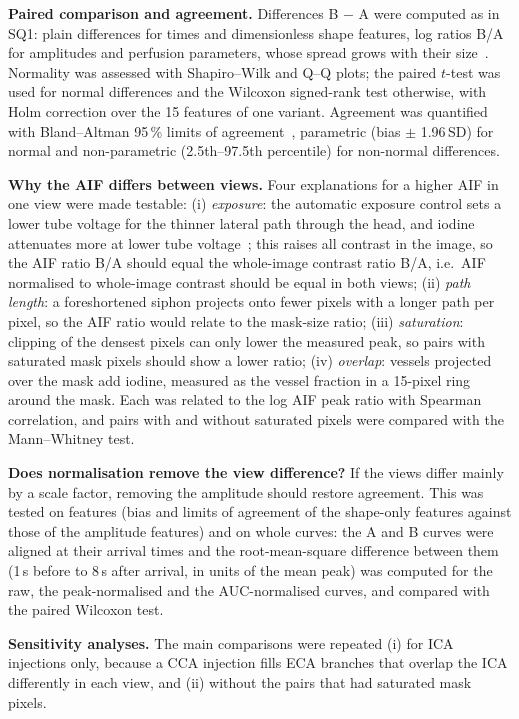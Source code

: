 \textbf{Paired comparison and agreement.} Differences B $-$ A were computed as in SQ1: plain differences for
times and dimensionless shape features, log ratios B/A for amplitudes and perfusion parameters, whose spread
grows with their size~\cite{bland1999}. Normality was assessed with Shapiro--Wilk and Q--Q plots; the paired
$t$-test was used for normal differences and the Wilcoxon signed-rank test otherwise, with Holm correction over
the 15 features of one variant. Agreement was quantified with Bland--Altman 95\,\% limits of
agreement~\cite{bland1999}, parametric (bias $\pm$ 1.96\,SD) for normal and non-parametric (2.5th--97.5th
percentile) for non-normal differences.

\textbf{Why the AIF differs between views.} Four explanations for a higher AIF in one view were made testable:
(i) \emph{exposure}: the automatic exposure control sets a lower tube voltage for the thinner lateral path through
the head, and iodine attenuates more at lower tube voltage~\cite{cho2012}; this raises all contrast in the image,
so the AIF ratio B/A should equal the whole-image contrast ratio B/A, i.e.\ AIF normalised to whole-image contrast
should be equal in both views; (ii) \emph{path length}: a foreshortened siphon projects onto fewer pixels with a
longer path per pixel, so the AIF ratio would relate to the mask-size ratio; (iii) \emph{saturation}: clipping of
the densest pixels can only lower the measured peak, so pairs with saturated mask pixels should show a lower
ratio; (iv) \emph{overlap}: vessels projected over the mask add iodine, measured as the vessel fraction in a
15-pixel ring around the mask. Each was related to the log AIF peak ratio with Spearman correlation, and pairs
with and without saturated pixels were compared with the Mann--Whitney test.

\textbf{Does normalisation remove the view difference?} If the views differ mainly by a scale factor, removing
the amplitude should restore agreement. This was tested on features (bias and limits of agreement of the
shape-only features against those of the amplitude features) and on whole curves: the A and B curves were
aligned at their arrival times and the root-mean-square difference between them (1\,s before to 8\,s after
arrival, in units of the mean peak) was computed for the raw, the peak-normalised and the AUC-normalised curves,
and compared with the paired Wilcoxon test.

\textbf{Sensitivity analyses.} The main comparisons were repeated (i) for ICA injections only, because a CCA
injection fills ECA branches that overlap the ICA differently in each view, and (ii) without the pairs that had
saturated mask pixels.

